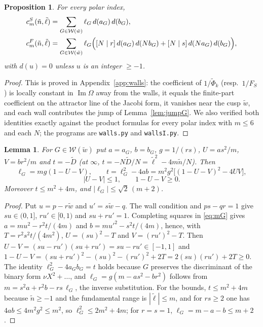 \documentclass[11pt]{amsart}
\numberwithin{equation}{section}
\theoremstyle{plain}
\newtheorem{lem}[thm]{Lemma}
\newtheorem{prop}[thm]{Proposition}
\theoremstyle{definition}
\theoremstyle{remark}
\newcommand{\tPhi}{\widetilde{\Phi}}
\begin{document}
\begin{prop}\label{prop:walls}
For every polar index,
\begin{align*}
c^{S}_m(\tilde n,\tilde\ell)&=\sum_{G\in\mathcal W(\tilde w)}\ell_G\,d(a_G)\,d(b_G),\\
c^F_m(\tilde n,\tilde\ell)&=\sum_{G\in\mathcal W(\tilde w)}\ell_G\Bigl([N\mid r]\,d(a_G)\,d(Nb_G)+[N\mid s]\,d(Na_G)\,d(b_G)\Bigr),
\end{align*}
with $d(u)=0$ unless $u$ is an integer $\ge-1$.
\end{prop}

\begin{proof}
This is proved in Appendix~\ref{app:walls}: the coefficient of $1/\tPhi_k$ (resp.\ $1/F_S$) is locally constant in $\operatorname{Im}\Omega$ away from the walls, it equals the finite-part coefficient on the attractor line of the Jacobi form, it vanishes near the cusp $\tilde w$, and each wall contributes the jump of Lemma~\ref{lem:jumpG}. We also verified both identities exactly against the product formulas for every polar index with $m\le6$ and each $N$; the programs are \texttt{walls.py} and \texttt{wallsI.py}.
\end{proof}

\begin{lem}\label{lem:wallgeom}
For $G\in\mathcal W(\tilde w)$ put $a=a_G$, $b=b_G$, $g=1/(rs)$, $U=as^2/m$, $V=br^2/m$ and $t=-\tilde D$ (at $\infty$, $t=-N\tilde D/N=\tilde\ell^2-4m\tilde n/N$). Then
\[
\ell_G=mg(1-U-V),\qquad t=\ell_G^2-4ab=m^2g^2\bigl[(1-U-V)^2-4UV\bigr],
\]
\[
|U-V|\le1,\qquad 1-U-V\ge0 .
\]
Moreover $t\le m^2+4m$, and $|\ell_G|\le\sqrt2\,(m+2)$.
\end{lem}

\begin{proof}
Put $u=p-r\tilde w$ and $u'=s\tilde w-q$. The wall condition and $ps-qr=1$ give $su\in(0,1]$, $ru'\in[0,1)$ and $su+ru'=1$. Completing squares in \eqref{eq:mG} gives $a=mu^2-r^2t/(4m)$ and $b=mu'^2-s^2t/(4m)$, hence, with $T=r^2s^2t/(4m^2)$, $U=(su)^2-T$ and $V=(ru')^2-T$. Then $U-V=(su-ru')(su+ru')=su-ru'\in[-1,1]$ and $1-U-V=(su+ru')^2-(su)^2-(ru')^2+2T=2(su)(ru')+2T\ge0$. The identity $\ell_G^2-4a_Gb_G=t$ holds because $G$ preserves the discriminant of the binary form $\nu X^2+\dots$, and $\ell_G=g(m-as^2-br^2)$ follows from $m=s^2a+r^2b-rs\,\ell_G$, the inverse substitution. For the bounds, $t\le m^2+4m$ because $\tilde n\ge-1$ and the fundamental range is $|\tilde\ell|\le m$, and for $rs\ge2$ one has $4ab\le4m^2g^2\le m^2$, so $\ell_G^2\le2m^2+4m$; for $r=s=1$, $\ell_G=m-a-b\le m+2$.
\end{proof}
\end{document}
